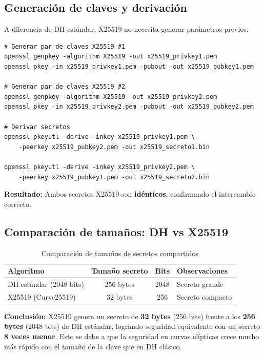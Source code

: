 \subsection{Generación de claves y derivación}

A diferencia de DH estándar, X25519 no necesita generar parámetros previos:

\begin{lstlisting}[caption=Derivación de secretos X25519]
# Generar par de claves X25519 #1
openssl genpkey -algorithm X25519 -out x25519_privkey1.pem
openssl pkey -in x25519_privkey1.pem -pubout -out x25519_pubkey1.pem

# Generar par de claves X25519 #2
openssl genpkey -algorithm X25519 -out x25519_privkey2.pem
openssl pkey -in x25519_privkey2.pem -pubout -out x25519_pubkey2.pem

# Derivar secretos
openssl pkeyutl -derive -inkey x25519_privkey1.pem \
    -peerkey x25519_pubkey2.pem -out x25519_secreto1.bin

openssl pkeyutl -derive -inkey x25519_privkey2.pem \
    -peerkey x25519_pubkey1.pem -out x25519_secreto2.bin
\end{lstlisting}

\textbf{Resultado:} Ambos secretos X25519 son \textbf{idénticos}, confirmando el intercambio correcto.

\subsection{Comparación de tamaños: DH vs X25519}

\begin{table}[H]
    \centering
    \caption{Comparación de tamaños de secretos compartidos}
    \begin{tabularx}{\textwidth}{l|c|c|p{5cm}}
        \toprule
        \textbf{Algoritmo} & \textbf{Tamaño secreto} & \textbf{Bits} & \textbf{Observaciones} \\
        \midrule
        DH estándar (2048 bits) & 256 bytes & 2048 & Secreto grande \\
        X25519 (Curve25519) & 32 bytes & 256 & Secreto compacto \\
        \bottomrule
    \end{tabularx}
\end{table}

\textbf{Conclusión:} X25519 genera un secreto de \textbf{32 bytes} (256 bits) frente a los \textbf{256 bytes} (2048 bits) de DH estándar, logrando seguridad equivalente con un secreto \textbf{8 veces menor}. Esto se debe a que la seguridad en curvas elípticas crece mucho más rápido con el tamaño de la clave que en DH clásico.
